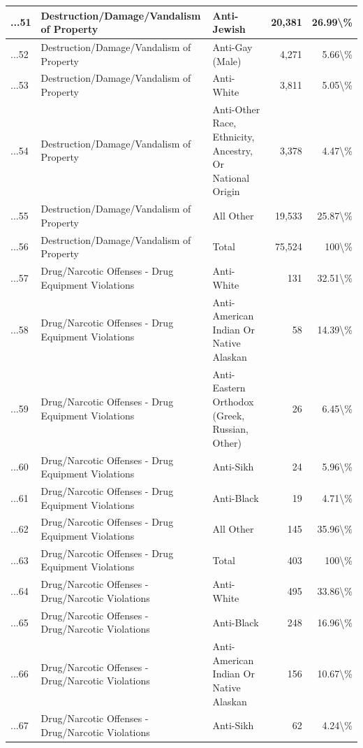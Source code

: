 \documentclass[
]{krantz}
\begin{document}
\begin{longtable}[t]{l|l|l|r|r}
\hline
...51 & Destruction/Damage/Vandalism of Property & Anti-Jewish & 20,381 & 26.99\textbackslash{}\%\\
\hline
...52 & Destruction/Damage/Vandalism of Property & Anti-Gay (Male) & 4,271 & 5.66\textbackslash{}\%\\
\hline
...53 & Destruction/Damage/Vandalism of Property & Anti-White & 3,811 & 5.05\textbackslash{}\%\\
\hline
...54 & Destruction/Damage/Vandalism of Property & Anti-Other Race, Ethnicity, Ancestry, Or National Origin & 3,378 & 4.47\textbackslash{}\%\\
\hline
...55 & Destruction/Damage/Vandalism of Property & All Other & 19,533 & 25.87\textbackslash{}\%\\
\hline
...56 & Destruction/Damage/Vandalism of Property & Total & 75,524 & 100\textbackslash{}\%\\
\hline
...57 & Drug/Narcotic Offenses - Drug Equipment Violations & Anti-White & 131 & 32.51\textbackslash{}\%\\
\hline
...58 & Drug/Narcotic Offenses - Drug Equipment Violations & Anti-American Indian Or Native Alaskan & 58 & 14.39\textbackslash{}\%\\
\hline
...59 & Drug/Narcotic Offenses - Drug Equipment Violations & Anti-Eastern Orthodox (Greek, Russian, Other) & 26 & 6.45\textbackslash{}\%\\
\hline
...60 & Drug/Narcotic Offenses - Drug Equipment Violations & Anti-Sikh & 24 & 5.96\textbackslash{}\%\\
\hline
...61 & Drug/Narcotic Offenses - Drug Equipment Violations & Anti-Black & 19 & 4.71\textbackslash{}\%\\
\hline
...62 & Drug/Narcotic Offenses - Drug Equipment Violations & All Other & 145 & 35.96\textbackslash{}\%\\
\hline
...63 & Drug/Narcotic Offenses - Drug Equipment Violations & Total & 403 & 100\textbackslash{}\%\\
\hline
...64 & Drug/Narcotic Offenses - Drug/Narcotic Violations & Anti-White & 495 & 33.86\textbackslash{}\%\\
\hline
...65 & Drug/Narcotic Offenses - Drug/Narcotic Violations & Anti-Black & 248 & 16.96\textbackslash{}\%\\
\hline
...66 & Drug/Narcotic Offenses - Drug/Narcotic Violations & Anti-American Indian Or Native Alaskan & 156 & 10.67\textbackslash{}\%\\
\hline
...67 & Drug/Narcotic Offenses - Drug/Narcotic Violations & Anti-Sikh & 62 & 4.24\textbackslash{}\%\\

\end{longtable}
\end{document}
